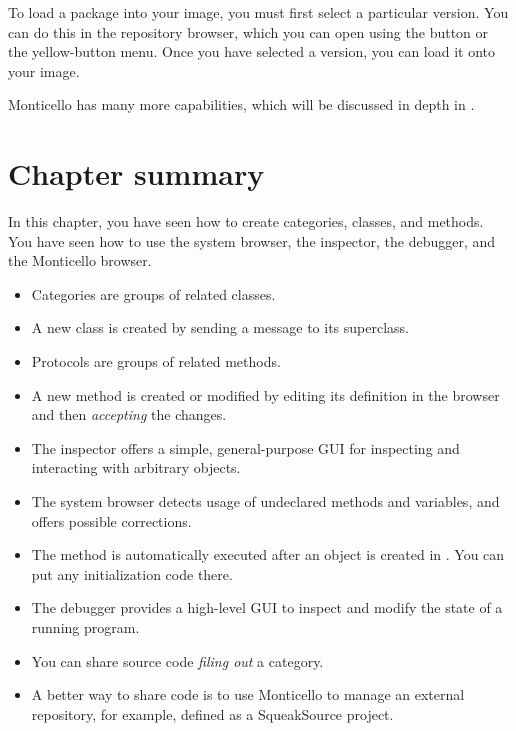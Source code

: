 \documentclass[a4paper,10pt,twoside]{book}
\begin{document}

To load a package into your image, you must first select a particular version.
You can do this in the repository browser, which you can open using the  button or the yellow-button menu.
Once you have selected a version, you can load it onto your image.


Monticello has many more capabilities, which will be discussed in depth in .

\section{Chapter summary}
In this chapter, you have seen how to create categories, classes, and methods.
You have seen how to use the system browser, the inspector, the debugger, and the Monticello browser.

\begin{itemize}
  \item Categories are groups of related classes.
  \item A new class is created by sending a message to its superclass.
  \item Protocols are groups of related methods.
  \item A new method is created or modified by editing its definition in the browser and then \emph{accepting} the changes.
  \item The inspector offers a simple, general-purpose GUI for inspecting and interacting with arbitrary objects.
  \item The system browser detects usage of undeclared methods and variables, and offers possible corrections.
  \item The  method is automatically executed after an object is created in \squeak.
  You can put any initialization code there.
  \item The debugger provides a high-level GUI to inspect and modify the state of a running program.
  \item You can share source code \emph{filing out} a category.
  \item A better way to share code is to use Monticello to manage an external repository, for example, defined as a SqueakSource project.
\end{itemize}

\ifx\wholebook\relax\else
\end{document}
